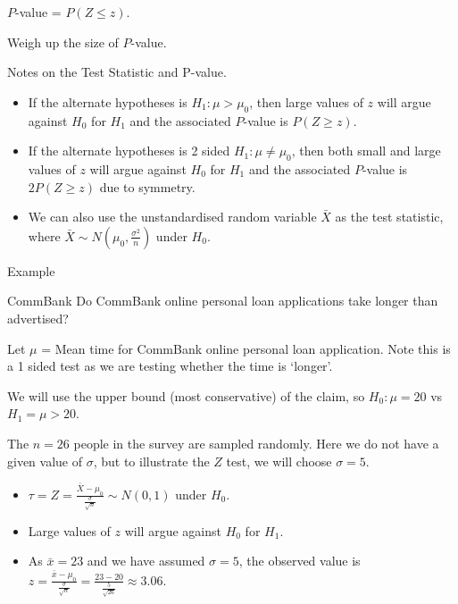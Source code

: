 \documentclass[t,xcolor=pdftex,dvipsnames,table]{beamer}
\begin{document}
\begin{frame}[fragile]{}

 $P$-value = $P( Z \leq z)$.

\vspace{.5cm}
 Weigh up the size of $P$-value.

\vspace{.5cm}
Notes on the Test Statistic and P-value.

\begin{itemize}
\item If the alternate hypotheses is $H_{1}: \mu > \mu_{0}$, then large values of $z$ will argue against $H_{0}$ for $H_{1}$ and the associated $P$-value is $P( Z \geq z)$. 
\item If the alternate hypotheses is 2 sided $H_{1}: \mu \neq \mu_{0}$, then both small and large values of $z$ will argue against $H_{0}$ for $H_{1}$ and the associated $P$-value is $2P( Z \geq z)$ due to symmetry.
\item We can also use the unstandardised random variable $\bar{X}$ as the test statistic, where $\bar{X} \sim N(\mu_{0}, \frac {\sigma^2}{n})$ under $H_{0}$.
\end{itemize}

\end{frame}  

\begin{frame}[fragile]{Example}

\begin{block}{CommBank}
Do CommBank online personal loan applications take longer than advertised?
\end{block}

\vspace{.5cm}
Let $\mu$ = Mean time for CommBank online personal loan application. Note this is a 1 sided test as we are testing whether the time is `longer'.

\vspace{.5cm}
We will use the upper bound (most conservative) of the claim, so  
$H_{0}: \mu = 20$ vs $H_{1} = \mu > 20$.

\vspace{.5cm}
 The $n=26$ people in the  survey are sampled randomly. Here we do not have a given value of $\sigma$, but to illustrate the $Z$ test, we will choose $\sigma = 5$.
\end{frame}


\begin{frame}[fragile]{}

\begin{itemize}
\item $\tau = Z = \frac{\bar{X} - \mu_{0}}{\frac{\sigma}{\sqrt{n}}}  \sim N(0,1)$ under $H_{0}$. 
\item Large values of $z$ will argue against $H_{0}$ for $H_{1}$. 
\item As $\bar{x}=23$ and we have assumed $\sigma=5$, the observed value is $z=  \frac{\bar{x} - \mu_{0}}{\frac{\sigma}{\sqrt{n}}} = \frac{23 - 20}{\frac{5}{\sqrt{26}}} \approx 3.06$.
\end{itemize}



\end{frame}  
\end{document}
